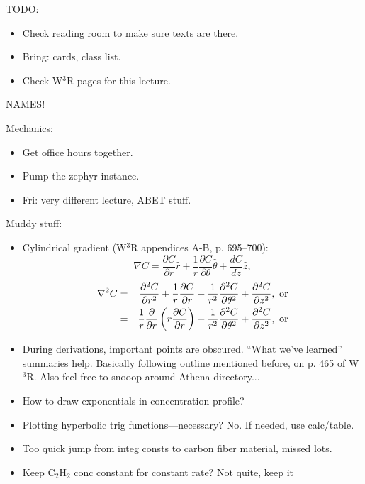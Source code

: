 \documentclass{report}
\begin{document}
TODO:
\begin{itemize}
\item Check reading room to make sure texts are there.
\item Bring: cards, class list.
\item Check W$^3$R pages for this lecture.
\end{itemize}
NAMES!

\noindent Mechanics:
\begin{itemize}
\item Get office hours together.
\item Pump the zephyr instance.
\item Fri: very different lecture, ABET stuff.
\end{itemize}

\noindent Muddy stuff:
\begin{itemize}
\item Cylindrical gradient (W$^3$R appendices A-B, p. 695--700):
  \begin{equation}
    \label{eq:cylgrad}
    \nabla C = \frac{\partial C}{\partial r}\hat{r}
    + \frac{1}{r}\frac{\partial C}{\partial\theta}\hat{\theta}
    + \frac{dC}{dz}\hat{z},
  \end{equation}
  \begin{eqnarray}
    \label{eq:cyllap}
    \nabla^2 C &=& \frac{\partial^2C}{\partial r^2}
    + \frac{1}{r}\frac{\partial C}{\partial r}
    + \frac{1}{r^2}\frac{\partial^2C}{\partial\theta^2}
    + \frac{\partial^2C}{\partial z^2},\ {\rm or} \\
    &=& \frac{1}{r}\frac{\partial}{\partial r}\left(
      r\frac{\partial C}{\partial r}\right)
    + \frac{1}{r^2}\frac{\partial^2C}{\partial\theta^2}
    + \frac{\partial^2C}{\partial z^2},\ {\rm or} \\
  \end{eqnarray}
\item During derivations, important points are obscured.  ``What we've
  learned'' summaries help.  Basically following outline mentioned before, on
  p. 465 of W$^3$R.  Also feel free to snooop around Athena directory...
\item How to draw exponentials in concentration profile?
\item Plotting hyperbolic trig functions---necessary?  No.  If needed, use
  calc/table.
\item Too quick jump from integ consts to carbon fiber material, missed lots.
\item Keep C$_2$H$_2$ conc constant for constant rate?  Not quite, keep it

\end{itemize}
\end{document}
